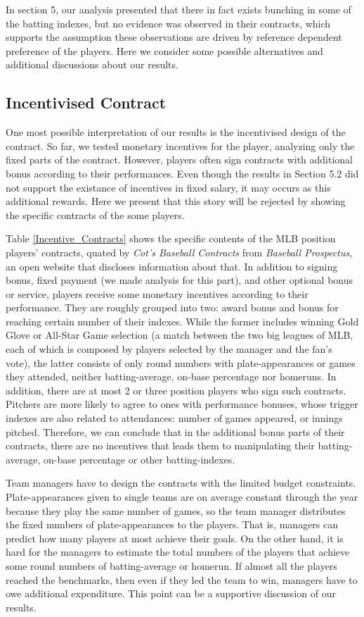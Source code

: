 \documentclass[dvipdfmx, 12pt]{article}
\begin{document}
In section 5, our analysis presented that there in fact exists bunching in some of the batting indexes, but no evidence was observed in their contracts, which supports the assumption these observations are driven by reference dependent preference of the players. Here we consider some possible alternatives and additional discussions about our results.

\subsection{Incentivised Contract}

One most possible interpretation of our results is the incentivised design of the contract. So far, we tested monetary incentives for the player, analyzing only the fixed parts of the contract. However, players often sign contracts with additional bonus according to their performances. Even though the results in Section 5.2 did not support the existance of incentives in fixed salary, it may occurs as this additional rewards. Here we present that this story will be rejected by showing the specific contracts of the some players.

Table \ref{Incentive_Contracts} shows the specific contents of the MLB position players' contracts, quated by \textit{Cot's Baseball Contracts} from \textit{Baseball Prospectus}, an open website that discloses information about that. In addition to signing bonus, fixed payment (we made analysis for this part), and other optional bonus or service, players receive some monetary incentives according to their performance. They are roughly grouped into two: award bonus and bonus for reaching certain number of their indexes. While the former includes winning Gold Glove or All-Star Game selection (a match between the two big leagues of MLB, each of which is composed by players selected by the manager and the fan's vote), the latter consists of only round numbers with plate-appearances or games they attended, neither batting-average, on-base percentage nor homeruns. In addition, there are at most 2 or three position players who sign such contracts. Pitchers are more likely to agree to ones with performance bonuses, whose trigger indexes are also related to attendances: number of games appeared, or innings pitched. Therefore, we can conclude that in the additional bonus parts of their contracts, there are no incentives that leads them to manipulating  their batting-average, on-base percentage or other batting-indexes.

Team managers have to design the contracts with the limited budget constraints. Plate-appearances given to single teams are on average constant through the year because they play the same number of games, so the team manager distributes the fixed numbers of plate-appearances to the players. That is, managers can predict how many players at most achieve their goals. On the other hand, it is hard for the managers to estimate the total numbers of the players that achieve some round numbers of batting-average or homerun. If almost all the players reached the benchmarks, then even if they led the team to win, managers have to owe additional expenditure. This point can be a supportive discussion of our results.
\end{document}
